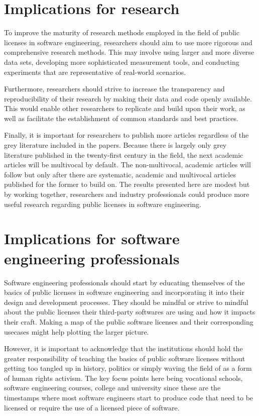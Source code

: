 \section{Implications for research}
To improve the maturity of research methods employed in the field of public licenses in software engineering, researchers should aim to use more rigorous and comprehensive research methods. This may involve using larger and more diverse data sets, developing more sophisticated measurement tools, and conducting experiments that are representative of real-world scenarios.

Furthermore, researchers should strive to increase the transparency and reproducibility of their research by making their data and code openly available. This would enable other researchers to replicate and build upon their work, as well as facilitate the establishment of common standards and best practices.

Finally, it is important for researchers to publish more articles regardless of the grey literature included in the papers. Because there is largely only grey literature published in the twenty-first century in the field, the next academic articles will be multivocal by default. The non-multivocal, academic articles will follow but only after there are systematic, academic and multivocal articles published for the former to build on. The results presented here are modest but by working together, researchers and industry professionals could produce more useful research regarding public licenses in software engineering.

\section{Implications for software engineering professionals}
Software engineering professionals should start by educating themselves of the basics of public licenses in software engineering and incorporating it into their design and development processes. They should be mindful or strive to mindful about the public licenses their third-party softwares are using and how it impacts their craft. Making a map of the public software licenses and their corresponding usecases might help plotting the larger picture.

However, it is important to acknowledge that the institutions should hold the greater responsibility of teaching the basics of public software licenses without getting too tangled up in history, politics or simply waving the field of as a form of human rights activism. The key focus points here being vocational schools, software engineering courses, college and university since these are the timestamps where most software engineers start to produce code that need to be licensed or require the use of a licensed piece of software.

